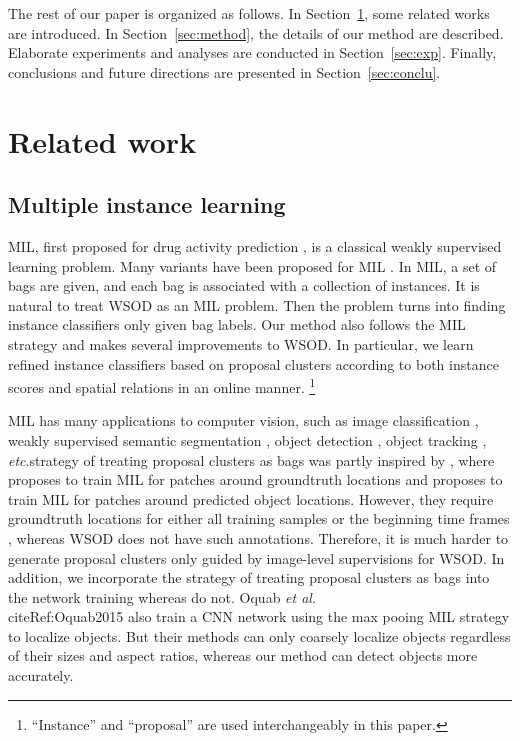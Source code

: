 \documentclass[10pt,journal,compsoc]{IEEEtran}
\def\etc{\emph{etc}.} \def\vs{\emph{vs}.}
\def\etal{\emph{et al}.}
\begin{document}
The rest of our paper is organized as follows.
In Section~\ref{sec:related_work}, some related works are introduced.
In Section~\ref{sec:method}, the details of our method are described.
Elaborate experiments and analyses are conducted in Section~\ref{sec:exp}.
Finally, conclusions and future directions are presented in Section~\ref{sec:conclu}.



\section{Related work}
\label{sec:related_work}

\subsection{Multiple instance learning}
\label{sec:rea_mil}

MIL, first proposed for drug activity prediction \cite{Ref:Dietterich1997}, is a classical weakly supervised learning problem.
Many variants have been proposed for MIL \cite{Ref:Andrews2003,Ref:Wang2015,Ref:Zhang2002,Ref:Wang2018}.
In MIL, a set of bags are given, and each bag is associated with a collection of instances.
It is natural to treat WSOD as an MIL problem.
Then the problem turns into finding instance classifiers only given bag labels.
Our method also follows the MIL strategy and makes several improvements to WSOD.
In particular, we learn refined instance classifiers based on proposal clusters according to both instance scores and spatial relations in an online manner.
\footnote{``Instance'' and ``proposal'' are used interchangeably in this paper.}

MIL has many applications to computer vision, such as image classification \cite{Ref:Li2013,Ref:Tang2017learning}, weakly supervised semantic segmentation \cite{Ref:Pathak15,Ref:Pinheiro2015}, object detection \cite{Ref:Zhang2006}, object tracking \cite{Ref:Babenko2011}, \etc\The strategy of treating proposal clusters as bags was partly inspired by \cite{Ref:Zhang2006,Ref:Babenko2011},
where \cite{Ref:Zhang2006} proposes to train MIL for patches around groundtruth locations
and \cite{Ref:Babenko2011} proposes to train MIL for patches around predicted object locations.
However, they require groundtruth locations for either all training samples \cite{Ref:Zhang2006} or the beginning time frames \cite{Ref:Babenko2011},
whereas WSOD does not have such annotations.
Therefore, it is much harder to generate proposal clusters only guided by image-level supervisions for WSOD.
In addition, we incorporate the strategy of treating proposal clusters as bags into the network training whereas \cite{Ref:Zhang2006,Ref:Babenko2011} do not.
Oquab \etal\\cite{Ref:Oquab2015} also train a CNN network using the max pooing MIL strategy to localize objects.
But their methods can only coarsely localize objects regardless of their sizes and aspect ratios, whereas our method can detect objects more accurately.
\end{document}
